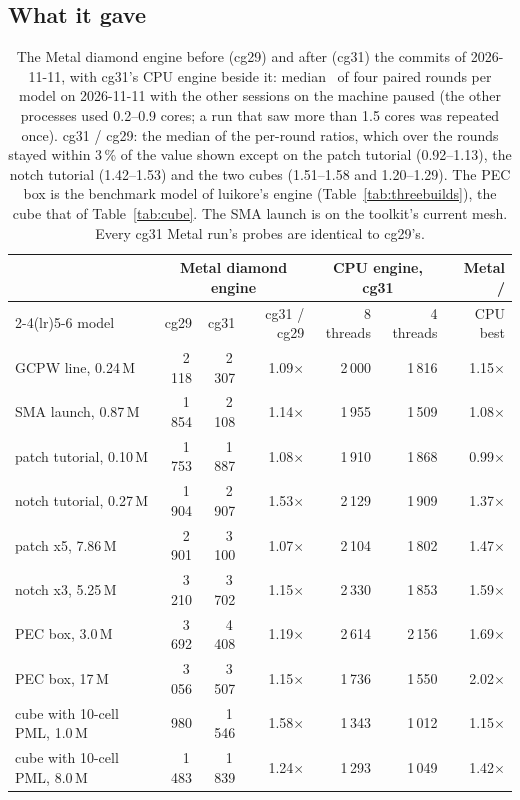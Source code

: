 \subsection{What it gave}
\begin{table}[H]\centering\small
\begin{tabular}{@{}lrrrrrr@{}}
\toprule
 & \multicolumn{3}{c}{Metal diamond engine} & \multicolumn{2}{c}{CPU engine, cg31} & Metal / \\
\cmidrule(lr){2-4}\cmidrule(lr){5-6}
model & cg29 & cg31 & cg31 / cg29 & 8 threads & 4 threads & CPU best \\
\midrule
GCPW line, 0.24\,M & 2\,118 & 2\,307 & 1.09$\times$ & 2\,000 & 1\,816 & 1.15$\times$ \\
SMA launch, 0.87\,M & 1\,854 & 2\,108 & 1.14$\times$ & 1\,955 & 1\,509 & 1.08$\times$ \\
patch tutorial, 0.10\,M & 1\,753 & 1\,887 & 1.08$\times$ & 1\,910 & 1\,868 & 0.99$\times$ \\
notch tutorial, 0.27\,M & 1\,904 & 2\,907 & 1.53$\times$ & 2\,129 & 1\,909 & 1.37$\times$ \\
patch x5, 7.86\,M & 2\,901 & 3\,100 & 1.07$\times$ & 2\,104 & 1\,802 & 1.47$\times$ \\
notch x3, 5.25\,M & 3\,210 & 3\,702 & 1.15$\times$ & 2\,330 & 1\,853 & 1.59$\times$ \\
\addlinespace
PEC box, 3.0\,M & 3\,692 & 4\,408 & 1.19$\times$ & 2\,614 & 2\,156 & 1.69$\times$ \\
PEC box, 17\,M & 3\,056 & 3\,507 & 1.15$\times$ & 1\,736 & 1\,550 & 2.02$\times$ \\
cube with 10-cell PML, 1.0\,M & 980 & 1\,546 & 1.58$\times$ & 1\,343 & 1\,012 & 1.15$\times$ \\
cube with 10-cell PML, 8.0\,M & 1\,483 & 1\,839 & 1.24$\times$ & 1\,293 & 1\,049 & 1.42$\times$ \\
\bottomrule
\end{tabular}
\caption{The Metal diamond engine before (cg29) and after (cg31) the commits of 2026-11-11, with cg31's CPU engine
beside it: median \MC\ of four paired rounds per model on 2026-11-11 with the other sessions on the machine paused
(the other processes used 0.2--0.9 cores; a run that saw more than 1.5 cores was repeated once). cg31 / cg29: the
median of the per-round ratios, which over the rounds stayed within 3\,\% of the value shown except on the patch
tutorial (0.92--1.13), the notch tutorial (1.42--1.53) and the two cubes (1.51--1.58 and 1.20--1.29). The PEC box is
the benchmark model of luikore's engine (Table~\ref{tab:threebuilds}), the cube that of Table~\ref{tab:cube}. The SMA
launch is on the toolkit's current mesh. Every cg31 Metal run's probes are identical to cg29's.}\label{tab:cg31}
\end{table}

